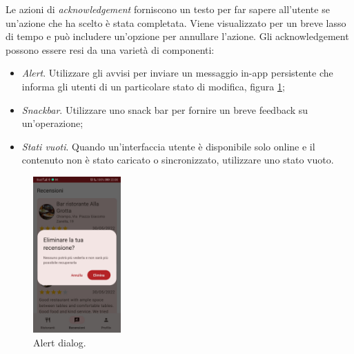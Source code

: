 \documentclass[12pt, a4paper]{report}
\begin{document}
	Le azioni di \textit{acknowledgement} forniscono un testo per far sapere all'utente se un'azione che ha scelto è stata completata. Viene visualizzato per un breve lasso di tempo e può includere un'opzione per annullare l'azione. Gli acknowledgement possono essere resi da una varietà di componenti:
	\begin{itemize}
		\item \textit{Alert}. Utilizzare gli avvisi per inviare un messaggio in-app persistente che informa gli utenti di un particolare stato di modifica, figura \ref{figAlert};
		\item \textit{Snackbar}. Utilizzare uno snack bar per fornire un breve feedback su un'operazione;
		\item \textit{Stati vuoti}. Quando un'interfaccia utente è disponibile solo online e il contenuto non è stato caricato o sincronizzato, utilizzare uno stato vuoto.
	\end{itemize}

	\begin{figure}[h]
		\centering
		\includegraphics[width=0.3\textwidth]{AlertDialog}
		\caption{Alert dialog.}
		\label{figAlert}
	\end{figure}
\end{document}
